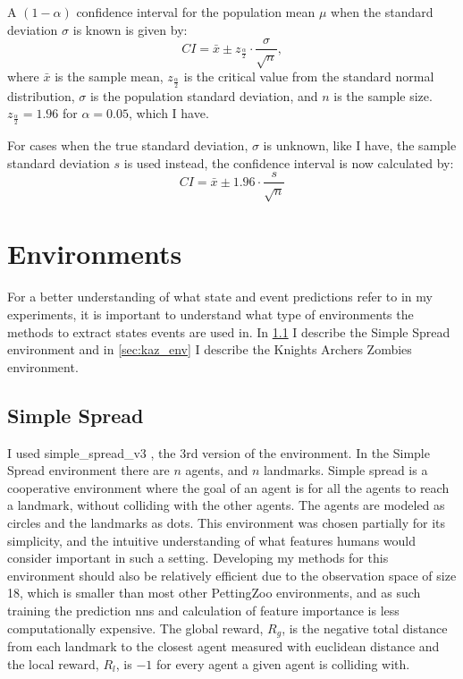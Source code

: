 \documentclass[UKenglish]{uiomasterthesis}
\begin{document}
A $(1-\alpha)$ confidence interval for the population mean \( \mu \) when the standard deviation \( \sigma \) is known is given by:
\[
CI = \bar{x} \pm z_{\frac{\alpha}{2}} \cdot \frac{\sigma}{\sqrt{n}},
\]
where $\bar{x}$ is the sample mean, $z_{\frac{\alpha}{2}}$ is the critical value from the standard normal distribution, $\sigma$ is the population standard deviation, and $n$ is the sample size. $z_{\frac{\alpha}{2}} = 1.96$ for $\alpha = 0.05$, which I have.

For cases when the true standard deviation, $\sigma$ is unknown, like I have, the sample standard deviation $s$ is used instead, the confidence interval is now calculated by:
\[
CI = \bar{x} \pm 1.96 \cdot \frac{s}{\sqrt{n}}
\]


\section{Environments}
\label{sec:env_meth}
For a better understanding of what state and event predictions refer to in my experiments, it is important to understand what type of environments the methods to extract states events are used in. In \cref{sec:simpl_env} I describe the Simple Spread environment and in \cref{sec:kaz_env} I describe the Knights Archers Zombies environment.

\subsection{Simple Spread}
\label{sec:simpl_env}
I used simple\_spread\_v3 \cite{spread}, the 3rd version of the environment. In the Simple Spread environment there are $n$ agents, and $n$ landmarks. Simple spread is a cooperative environment where the goal of an agent is for all the agents to reach a landmark, without colliding with the other agents. The agents are modeled as circles and the landmarks as dots. This environment was chosen partially for its simplicity, and the intuitive understanding of what features humans would consider important in such a setting. Developing my methods for this environment should also be relatively efficient due to the observation space of size 18, which is smaller than most other PettingZoo environments, and as such training the prediction \acp{nn} and calculation of feature importance is less computationally expensive. The global reward, $R_g$, is the negative total distance from each landmark to the closest agent measured with euclidean distance and the local reward, $R_l$, is $-1$ for every agent a given agent is colliding with.
\end{document}
